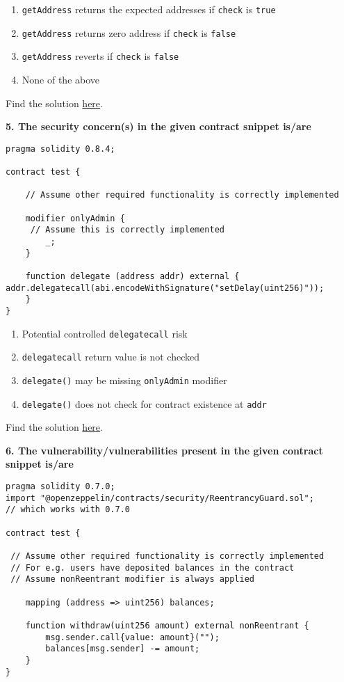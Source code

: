 \begin{enumerate}[label=\Alph*.]
    \item\verb|getAddress| returns the expected addresses if \verb|check| is \verb|true|
    \item\verb|getAddress| returns zero address if \verb|check| is \verb|false|
    \item\verb|getAddress| reverts if \verb|check| is \verb|false|
    \item None of the above
\end{enumerate}

Find the solution \hyperref[sec:exam4_q4]{here}.\\

\pagebreak

\textbf{5. The security concern(s) in the given contract snippet is/are}

\begin{lstlisting}[language=Solidity, style=solStyle]
pragma solidity 0.8.4;

contract test {

    // Assume other required functionality is correctly implemented

    modifier onlyAdmin {
     // Assume this is correctly implemented
        _;
    }

    function delegate (address addr) external {  addr.delegatecall(abi.encodeWithSignature("setDelay(uint256)"));
    }
}
\end{lstlisting}

\begin{enumerate}[label=\Alph*.]
    \item Potential controlled \verb|delegatecall| risk
    \item\verb|delegatecall| return value is not checked
    \item\verb|delegate()| may be missing \verb|onlyAdmin| modifier
    \item\verb|delegate()| does not check for contract existence at \verb|addr|
\end{enumerate}

Find the solution \hyperref[sec:exam4_q5]{here}.\\

\pagebreak

\textbf{6. The vulnerability/vulnerabilities present in the given contract snippet is/are}

\begin{lstlisting}[language=Solidity, style=solStyle]
pragma solidity 0.7.0;
import "@openzeppelin/contracts/security/ReentrancyGuard.sol";
// which works with 0.7.0

contract test {

 // Assume other required functionality is correctly implemented
 // For e.g. users have deposited balances in the contract
 // Assume nonReentrant modifier is always applied

    mapping (address => uint256) balances;

    function withdraw(uint256 amount) external nonReentrant {
        msg.sender.call{value: amount}("");
        balances[msg.sender] -= amount;
    }
}
\end{lstlisting}

